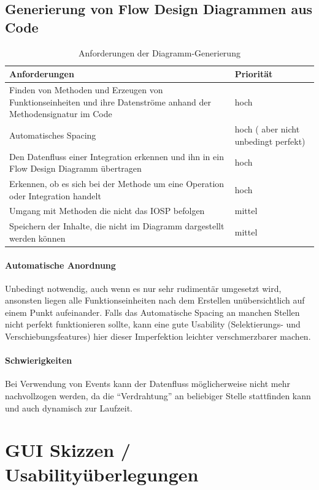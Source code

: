 \section{Generierung von Flow Design Diagrammen aus Code}
\begin{table}[H]
\begin{tabularx}{\textwidth}{X|l}
Anforderungen & Priorität\\
 \hline \hline
Finden von Methoden und Erzeugen von Funktionseinheiten und ihre Datenströme anhand der Methodensignatur im Code & hoch\\ \hline
Automatisches Spacing & hoch ( aber nicht unbedingt perfekt)\\ \hline
Den Datenfluss einer Integration erkennen und ihn in ein Flow Design Diagramm übertragen & hoch\\ \hline
Erkennen, ob es sich bei der Methode um eine Operation oder Integration handelt & hoch\\ \hline
Umgang mit Methoden die nicht das IOSP befolgen & mittel\\ \hline
Speichern der Inhalte, die nicht im Diagramm dargestellt werden können & mittel\\ \hline
\end{tabularx}
\caption{Anforderungen der Diagramm-Generierung}
\end{table}



\subsubsection{Automatische Anordnung}

Unbedingt notwendig, auch wenn es nur sehr rudimentär umgesetzt wird, ansonsten liegen
alle Funktionseinheiten nach dem Erstellen unübersichtlich auf einem Punkt aufeinander.
Falls das Automatische Spacing an manchen Stellen nicht perfekt funktionieren
sollte, kann eine gute Usability (Selektierungs- und Verschiebungsfeatures)
hier dieser Imperfektion leichter verschmerzbarer machen.

\subsubsection{Schwierigkeiten}
Bei Verwendung von Events kann der Datenfluss möglicherweise nicht mehr nachvollzogen werden, da die \enquote{Verdrahtung} an beliebiger Stelle stattfinden kann und auch dynamisch zur Laufzeit.


\pagebreak
\chapter{GUI Skizzen / Usabilityüberlegungen}


